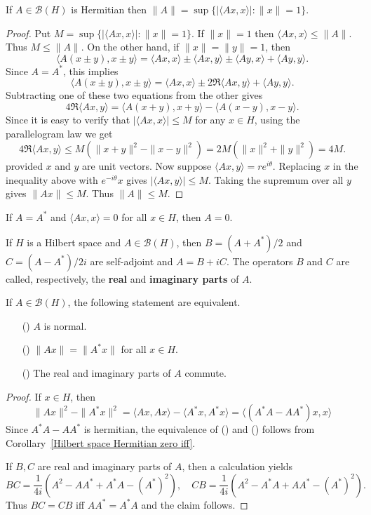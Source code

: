 \begin{proposition}\label{Hilbert space Hermitian operator norm by inner product}
If $A\in\mathcal{B}(H)$ is Hermitian then $\|A\|=\sup\{|\langle Ax,x\rangle|:\|x\|=1\}$.
\end{proposition}
\begin{proof}
Put $M=\sup\{|\langle Ax,x\rangle|:\|x\|=1\}$. If $\|x\|=1$ then $\langle Ax,x\rangle\leq\|A\|$. Thus $M\leq\|A\|$. On the other hand, if $\|x\|=\|y\|=1$, then
\[\langle A(x\pm y),x\pm y\rangle=\langle Ax,x\rangle\pm\langle Ax,y\rangle\pm\langle Ay,x\rangle+\langle Ay,y\rangle.\]
Since $A=A^*$, this implies
\[\langle A(x\pm y),x\pm y\rangle=\langle Ax,x\rangle\pm 2\Re\langle Ax,y\rangle+\langle Ay,y\rangle.\]
Subtracting one of these two equations from the other gives
\[4\Re\langle Ax,y\rangle=\langle A(x+y),x+y\rangle-\langle A(x-y),x-y\rangle.\]
Since it is easy to verify that $|\langle Ax,x\rangle|\leq M$ for any $x\in H$, using the parallelogram law we get 
\[4\Re\langle Ax,y\rangle\leq M(\|x+y\|^2-\|x-y\|^2)=2M(\|x\|^2+\|y\|^2)=4M.\]
provided $x$ and $y$ are unit vectors. Now suppose $\langle Ax,y\rangle=re^{i\theta}$. Replacing $x$ in the inequality above with $e^{-i\theta}x$ gives $|\langle Ax,y\rangle|\leq M$. Taking the supremum over all $y$ gives $\|Ax\|\leq M$. Thus $\|A\|\leq M$.
\end{proof}
\begin{corollary}\label{Hilbert space Hermitian zero iff}
If $A=A^*$ and $\langle Ax,x\rangle=0$ for all $x\in H$, then $A=0$.
\end{corollary}
If $H$ is a Hilbert space and $A\in\mathcal{B}(H)$, then $B=(A+A^*)/2$ and $C=(A-A^*)/2i$ are self-adjoint and $A=B+iC$. The operators $B$ and $C$ are called, respectively, the \textbf{real} and \textbf{imaginary parts} of $A$.
\begin{proposition}\label{Hilbert space normal operator iff}
If $A\in\mathcal{B}(H)$, the following statement are equivalent.
\begin{itemize}
\item[(\rmnum{1})] $A$ is normal.
\item[(\rmnum{2})] $\|Ax\|=\|A^*x\|$ for all $x\in H$.
\item[(\rmnum{3})] The real and imaginary parts of $A$ commute.
\end{itemize}
\end{proposition}
\begin{proof}
If $x\in H$, then
\[\|Ax\|^2-\|A^*x\|^2=\langle Ax,Ax\rangle-\langle A^*x,A^*x\rangle=\langle(A^*A-AA^*)x,x\rangle\]
Since $A^*A-AA^*$ is hermitian, the equivalence of () and () follows from Corollary~\ref{Hilbert space Hermitian zero iff}.\par
If $B,C$ are real and imaginary parts of $A$, then a calculation yields
\[BC=\frac{1}{4i}(A^2-AA^*+A^*A-(A^*)^2),\quad CB=\frac{1}{4i}(A^2-A^*A+AA^*-(A^*)^2).\]
Thus $BC=CB$ iff $AA^*=A^*A$ and the claim follows.
\end{proof}
